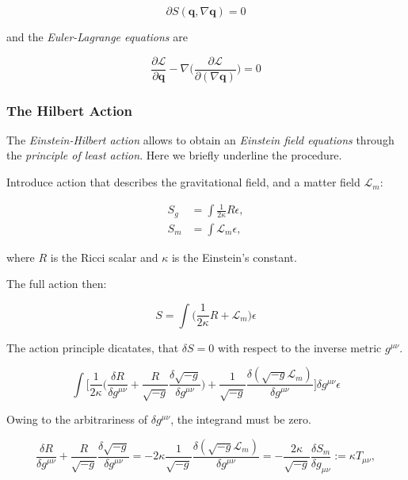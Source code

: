 \begin{equation}
\partial S(\boldsymbol{q}, \nabla\boldsymbol{q}) = 0
\end{equation}

and the \textit{Euler-Lagrange equations} are

\begin{equation}
\frac{\partial \mathcal{L}}{\partial\boldsymbol{q}} - \nabla\Big(\frac{\partial\mathcal{L}}{\partial(\nabla\boldsymbol{q})}\Big) = 0
\label{eq:theory:eulerlagrange}
\end{equation}

\subsubsection{The Hilbert Action}

The \textit{Einstein-Hilbert action} allows to obtain an \textit{Einstein field equations} through the \textit{principle of least action}. Here we briefly underline the procedure.

Introduce action that describes the gravitational field, and a matter field $\mathcal{L}_m$:

\begin{align}
S_g &= \int\frac{1}{2\kappa}R\epsilon, \\
S_m &= \int\mathcal{L}_{m}\epsilon,
\end{align}

where $R$ is the Ricci scalar and $\kappa$ is the  Einstein's constant.

The full action then:

\begin{equation}
S = \int\Big(\frac{1}{2\kappa}R+\mathcal{L}_m\Big)\epsilon
\end{equation}

The action principle dicatates, that $\delta S = 0$  with respect to the inverse metric $g^{\mu\nu}$. 

\begin{equation}
\int\Bigg[\frac{1}{2\kappa}\Big(\frac{\delta R}{\delta g^{\mu\nu}}+\frac{R}{\sqrt{-g}}\frac{\delta\sqrt{-g}}{\delta g^{\mu\nu}}\Big) + \frac{1}{\sqrt{-g}}\frac{\delta(\sqrt{-g}\mathcal{L}_m)}{\delta g^{\mu\nu}}\Bigg]\delta g^{\mu\nu}\epsilon
\end{equation}

Owing to the arbitrariness of $\delta g^{\mu\nu}$, the integrand must be zero. 

\begin{equation}
\frac{\delta R}{\delta g^{\mu\nu}} + \frac{R}{\sqrt{-g}}\frac{\delta\sqrt{-g}}{\delta g^{\mu\nu}} = -2\kappa\frac{1}{\sqrt{-g}}\frac{\delta(\sqrt{-g}\mathcal{L}_m)}{\delta g^{\mu\nu}} = -\frac{2\kappa}{\sqrt{-g}}\frac{\delta S_m}{\delta g_{\mu\nu}} := \kappa T_{\mu\nu},
\label{eq:theory:action1}
\end{equation}

